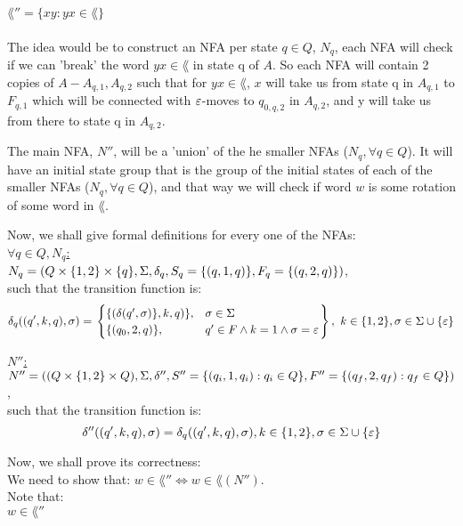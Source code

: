 $\lang''=\{xy : yx \in \lang \}$
\\ \\
The idea would be to construct an NFA per state $q \in Q$, $N_q$,
each NFA will check if we can 'break' the word $yx \in \lang$ in state q of $A$.
So each NFA will contain 2 copies of $A - A_{q,1}, A_{q,2}$ such that for
$yx \in \lang$, $x$ will take us from state q in $A_{q,1}$ to $F_{q,1}$
which will be connected with $\varepsilon$-moves to $q_{0,q,2}$ in $A_{q,2}$,
and y will take us from there to state q in $A_{q,2}$.

The main NFA, $N''$, will be a 'union' of the he smaller NFAs ($N_q, \forall q \in Q$).
It will have an initial state group that is the group of the initial states of each of the
smaller NFAs ($N_q, \forall q \in Q$), and that way we will check if word $w$
is some rotation of some word in $\lang$.

Now, we shall give formal definitions for every one of the NFAs: \\

\underline{$\forall q \in Q, N_q$:} \\

$N_q=(Q \times \{1,2\} \times \{q\}, \Sigma, \delta_q, S_q=\{(q, 1, q)\}, F_q=\{(q, 2, q)\})$, \\
such that the transition function is: \\
\[
    \delta_q((q', k, q),\sigma) = \left.
    \begin{cases}
        \{(\delta(q',\sigma)\}, k, q)\} , & \sigma \in \Sigma                          \\
        \{(q_0, 2, q)\},            & q' \in F \wedge k=1 \wedge \sigma=\varepsilon \\
    \end{cases}
    \right\} , \text{ } k \in \{1,2\}, \sigma \in \Sigma \cup \{\varepsilon\}
\]

\underline{$N''$:} \\

$N''=((Q \times \{1,2\} \times Q), \Sigma, \delta'',
    S''=\{(q_i, 1, q_i) : q_i \in Q\}, F''=\{(q_f, 2, q_f) : q_f \in Q\})$, \\
such that the transition function is: \\
\[
    \delta''((q', k, q),\sigma) = \delta_{q}((q', k, q),\sigma),  k \in \{1,2\}, \sigma \in \Sigma \cup \{\varepsilon\}
\]

Now, we shall prove its correctness: \\
We need to show that: $w \in \lang'' \Longleftrightarrow  w \in \lang(N'')$. \\
Note that: \\
$w \in \lang''$\\

